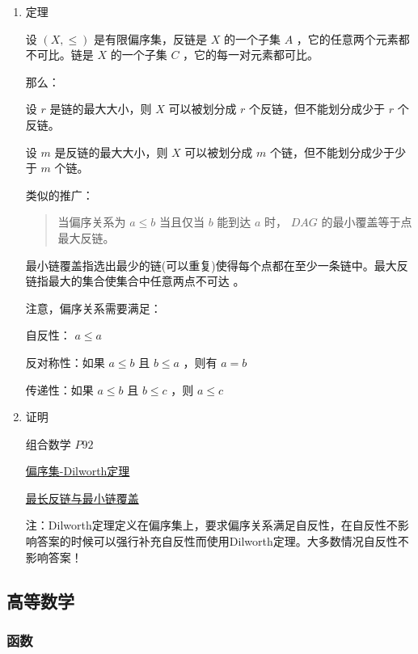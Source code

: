 \documentclass[11pt]{article}
\begin{document}
\begin{enumerate}
\item 定理
\label{sec-3-4-1-1}

设 $(X,\leq)$ 是有限偏序集，反链是 $X$ 的一个子集 $A$ ，它的任意两个元素都不可比。链是 $X$ 的一个子集 $C$ ，它的每一对元素都可比。

那么：

设 $r$ 是链的最大大小，则 $X$ 可以被划分成 $r$ 个反链，但不能划分成少于 $r$ 个反链。

设 $m$ 是反链的最大大小，则 $X$ 可以被划分成 $m$ 个链，但不能划分成少于少于 $m$ 个链。

类似的推广：

\begin{quote}
当偏序关系为 $a \leq b$ 当且仅当 $b$ 能到达 $a$ 时， $DAG$ 的最小覆盖等于点最大反链。
\end{quote}

最小链覆盖指选出最少的链(可以重复)使得每个点都在至少一条链中。最大反链指最大的集合使集合中任意两点不可达 。


注意，偏序关系需要满足：

自反性： $a \leq a$ 

反对称性：如果 $a \leq b$ 且 $b \leq a$ ，则有 $a = b$ 

传递性：如果 $a \leq b$ 且 $b \leq c$ ，则 $a \leq c$ 

\item 证明
\label{sec-3-4-1-2}

组合数学 $P92$

\href{http://blog.csdn.net/xuzengqiang/article/details/7266034}{偏序集-Dilworth定理}

\href{http://vfleaking.blog.163.com/blog/static/1748076342012918105514527}{最长反链与最小链覆盖}

注：Dilworth定理定义在偏序集上，要求偏序关系满足自反性，在自反性不影响答案的时候可以强行补充自反性而使用Dilworth定理。大多数情况自反性不影响答案！
\end{enumerate}
\subsection{高等数学}
\label{sec-3-5}
\subsubsection{函数}
\label{sec-3-5-1}
\end{document}

